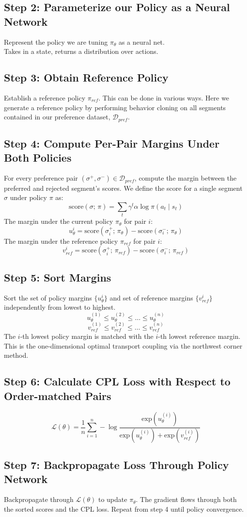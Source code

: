 \documentclass{article}
\begin{document}
\subsection*{Step 2: Parameterize our Policy as a Neural Network}
Represent the policy we are tuning $\pi_\theta$ as a neural net.\\
Takes in a state, returns a distribution over actions.

\subsection*{Step 3: Obtain Reference Policy}
Establish a reference policy $\pi_{ref}$. This can be done in various ways. Here we generate a reference policy by performing behavior cloning on all segments contained in our preference dataset, $\mathcal{D}_{pref}$.

\subsection*{Step 4: Compute Per-Pair Margins Under Both Policies}
For every preference pair $(\sigma^+,\sigma^-)\in\mathcal{D}_{pref}$, compute the margin between the preferred and rejected segment's scores. We define the score for a single segment $\sigma$ under policy $\pi$ as:
$$\text{score}(\sigma;\,\pi)=\sum_{t} \gamma^t \alpha \log \pi(a_t \mid s_t)$$
The margin under the current policy $\pi_{\theta}$ for pair $i$:
$$u_\theta^i = \text{score}(\sigma_i^+;\,\pi_\theta) - \text{score}(\sigma_i^-;\,\pi_\theta)$$
The margin under the reference policy $\pi_{ref}$ for pair $i$:
$$v_{ref}^i = \text{score}(\sigma_i^+;\,\pi_{ref}) - \text{score}(\sigma_i^-;\,\pi_{ref})$$

\subsection*{Step 5: Sort Margins}
Sort the set of policy margins $\{u_\theta^i\}$ and set of reference margins $\{v_{ref}^i\}$ independently from lowest to highest.
$$u_\theta^{(1)} \leq u_\theta^{(2)} \leq \ldots \leq u_\theta^{(n)}$$
$$v_{ref}^{(1)} \leq v_{ref}^{(2)} \leq \ldots \leq v_{ref}^{(n)}$$
The $i$-th lowest policy margin is matched with the $i$-th lowest reference margin. This is the one-dimensional optimal transport coupling via the northwest corner method.

\subsection*{Step 6: Calculate CPL Loss with Respect to Order-matched Pairs}
$$\mathcal{L}(\theta)=\frac{1}{n}\sum_{i=1}^{n}-\log \frac{\text{exp}(u_\theta^{(i)})}{\text{exp}(u_\theta^{(i)})+\text{exp}(v_{ref}^{(i)})}$$

\subsection*{Step 7: Backpropagate Loss Through Policy Network}
Backpropagate through $\mathcal{L}(\theta)$ to update $\pi_\theta$. The gradient flows through both the sorted scores and the CPL loss. Repeat from step 4 until policy convergence.
\end{document}
